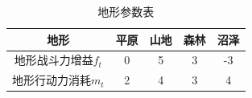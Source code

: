\documentclass[a4paper,4pt]{article}
\begin{document}
\begin{table}[htbp]
  \centering
  \caption{地形参数表}
  \begin{tabular}{c|c|c|c|c}
    \hline
    地形                & 平原 & 山地 & 森林 & 沼泽 \bigstrut \\
    \hline
    地形战斗力增益$f_t$ & 0    & 5    & 3    & -3 \bigstrut   \\
    \hline
    地形行动力消耗$m_t$ & 2    & 4    & 3    & 4 \bigstrut    \\
    \hline
  \end{tabular}%
  \label{地形}%
\end{table}%
\end{document}
